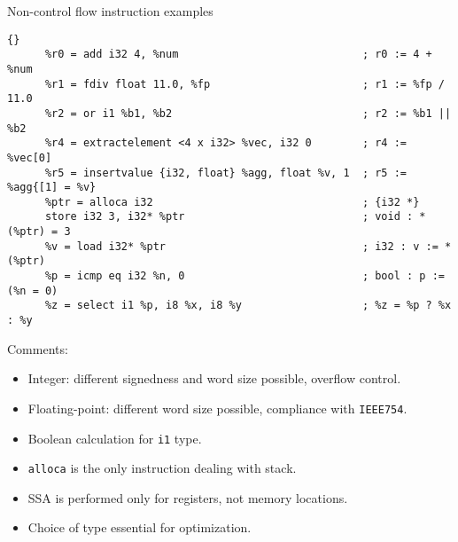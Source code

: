 \documentclass[8pt]{beamer}
\begin{document}
\begin{frame}[fragile]{Non-control flow instruction examples}
  \begin{exampleblock}{}
    \begin{lstlisting}{}
      %r0 = add i32 4, %num                             ; r0 := 4 + %num
      %r1 = fdiv float 11.0, %fp                        ; r1 := %fp / 11.0
      %r2 = or i1 %b1, %b2                              ; r2 := %b1 || %b2
      %r4 = extractelement <4 x i32> %vec, i32 0        ; r4 := %vec[0]
      %r5 = insertvalue {i32, float} %agg, float %v, 1  ; r5 := %agg{[1] = %v}
      %ptr = alloca i32                                 ; {i32 *}
      store i32 3, i32* %ptr                            ; void : *(%ptr) = 3
      %v = load i32* %ptr                               ; i32 : v := *(%ptr)
      %p = icmp eq i32 %n, 0                            ; bool : p := (%n = 0)
      %z = select i1 %p, i8 %x, i8 %y                   ; %z = %p ? %x : %y
    \end{lstlisting}
  \end{exampleblock}

  \begin{block}{Comments:}
    \begin{itemize}
      \item Integer: different signedness and word size possible, overflow
        control.
      \item Floating-point: different word size possible, compliance with
        \verb+IEEE754+.
      \item Boolean calculation for \verb+i1+ type.
      \item \verb+alloca+ is the only instruction dealing with stack.
      \item SSA is performed only for registers, not memory locations.
      \item Choice of type essential for optimization.
    \end{itemize}
  \end{block}
\end{frame}
\end{document}
